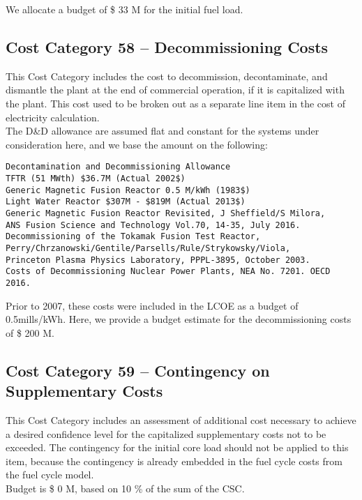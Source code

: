 We allocate a budget of \$ 33 M for the initial fuel load.  

\subsection*{Cost Category 58 – Decommissioning Costs}
This Cost Category includes the cost to decommission, decontaminate, and dismantle the plant at the end of commercial operation, if it is capitalized with the plant.  This cost used to be broken out as a separate line item in the cost of electricity calculation.\\

The D\&D allowance are assumed flat and constant for the systems under consideration here, and we base the amount on the following:

\begin{verbatim} 
Decontamination and Decommissioning Allowance 
TFTR (51 MWth) $36.7M (Actual 2002$) 
Generic Magnetic Fusion Reactor 0.5 M/kWh (1983$) 
Light Water Reactor $307M - $819M (Actual 2013$) 
Generic Magnetic Fusion Reactor Revisited, J Sheffield/S Milora,  
ANS Fusion Science and Technology Vol.70, 14-35, July 2016. 
Decommissioning of the Tokamak Fusion Test Reactor,
Perry/Chrzanowski/Gentile/Parsells/Rule/Strykowsky/Viola, 
Princeton Plasma Physics Laboratory, PPPL-3895, October 2003.
Costs of Decommissioning Nuclear Power Plants, NEA No. 7201. OECD 2016.
\end{verbatim} 

Prior to 2007, these costs were included in the LCOE as a budget of 0.5mills/kWh.  Here, we provide a budget estimate for the decommissioning costs of \$ 200 M.  

\subsection*{Cost Category 59 – Contingency on Supplementary Costs}
This Cost Category includes an assessment of additional cost necessary to achieve a desired confidence level for the capitalized supplementary costs not to be exceeded. The contingency for the initial core load should not be applied to this item, because the contingency is already embedded in the fuel cycle costs from the fuel cycle model.\\

Budget is \$ 0 M, based on 10 \% of the sum of the CSC.
